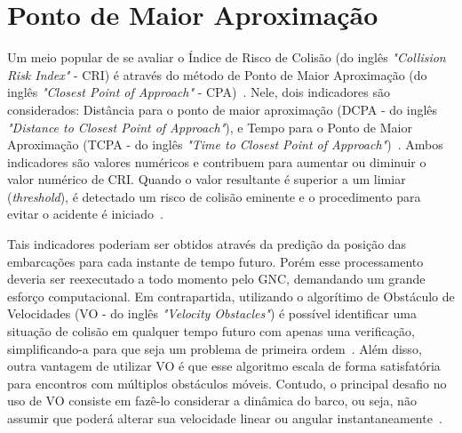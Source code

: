     \section{Ponto de Maior Aproximação}\label{subchap2:cpa}
        Um meio popular de se avaliar o Índice de Risco de Colisão (do inglês \textit{"Collision Risk Index"} - CRI) é através do método de Ponto de Maior Aproximação (do inglês \textit{"Closest Point of Approach"} -  CPA)~\cite{HUANG2020451}. Nele, dois indicadores são considerados: Distância para o ponto de maior aproximação (DCPA - do inglês \textit{"Distance to Closest Point of Approach"}), e Tempo para o Ponto de Maior Aproximação (TCPA - do inglês \textit{"Time to Closest Point of Approach"})~\cite{HUANG2019142}. Ambos indicadores são valores numéricos e contribuem para aumentar ou diminuir o valor numérico de CRI. Quando o valor resultante é superior a um limiar (\textit{threshold}), é detectado um risco de colisão eminente e o procedimento para evitar o acidente é iniciado~\cite{HUANG2020451}. 
        
        Tais indicadores poderiam ser obtidos através da predição da posição das embarcações para cada instante de tempo futuro. Porém esse processamento deveria ser reexecutado a todo momento pelo GNC, demandando um grande esforço computacional. Em contrapartida, utilizando o algorítimo de Obstáculo de Velocidades (VO - do inglês \textit{"Velocity Obstacles"}) é possível identificar uma situação de colisão em qualquer tempo futuro com apenas uma verificação, simplificando-a para que seja um problema de primeira ordem~\cite{KUWATA2014110}. Além disso, outra vantagem de utilizar VO é que esse algoritmo escala de forma satisfatória para encontros com múltiplos obstáculos móveis. Contudo, o principal desafio no uso de VO consiste em fazê-lo considerar a dinâmica do barco, ou seja, não assumir que poderá alterar sua velocidade linear ou angular instantaneamente~\cite{HUANG2019142}.
        
